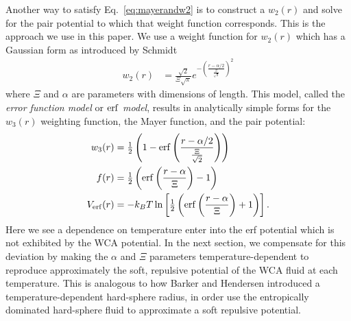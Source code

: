 \documentclass[letterpaper,twocolumn,amsmath,amssymb,prb]{revtex4-1}
\begin{document}
Another way to satisfy Eq.~\ref{eq:mayerandw2} is to 
construct a $w_2(r)$ and solve for 
the pair potential to which that weight function corresponds.  
This is the approach we use in this paper. We use a weight function 
for $w_2(r)$ which has a Gaussian form as introduced by Schmidt~\cite{schmidt2000fluid} 
\begin{align}
  w_2(r) &= \frac{\sqrt{2}}{\Xi \sqrt{\pi}} e^{-\left( \frac{r-\alpha/2}
  {\frac{\Xi}{\sqrt{2}}} \right)^2}
  \label{eq:gaussianw2}
\end{align}
where $\Xi$ and $\alpha$ are parameters with dimensions of length. 
This model, called the \emph{error function model} or \emph{$\mathrm{erf}$ model},
results in analytically simple forms 
for the $w_3(r)$ weighting function, the Mayer function, and the pair
potential:
\begin{align}
  w_3(r) &= \tfrac12 \left( 1 - \mathrm{erf}\left(\frac{r-\alpha/2}
  {\frac{\Xi}{\sqrt{2}}}\right) \right) \\
  f(r) &= \tfrac12 \left( \mathrm{erf}\left( \frac{r - \alpha}{\Xi} 
  \right) - 1 \right) \label{eq:mayer-approx} \\
  V_{\mathrm{erf}}(r) &= -k_BT\ln\left[\tfrac12 \left( \mathrm{erf}\left( \frac{r -
    \alpha}{\Xi} \right) + 1 \right) \right].\label{eq:Verf}
\end{align}
Here we see a dependence on temperature enter into the erf potential
which is not exhibited by the WCA potential. In the next section, 
we compensate for this deviation by making
the $\alpha$ and $\Xi$ parameters temperature-dependent to reproduce 
approximately the soft, repulsive potential of the WCA fluid at each temperature.
This is analogous to how Barker and Hendersen introduced a temperature-dependent
hard-sphere radius, in order use the entropically dominated hard-sphere fluid
to approximate a soft repulsive potential.

\end{document}
